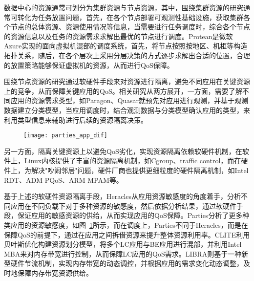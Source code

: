 
数据中心的资源通常可划分为集群资源与节点资源，其中，围绕集群资源的研究通常可转化为任务放置问题，首先，在各个节点部署可观测性基础设施，获取集群各个节点的总体资源、资源使用情况等信息，当需要进行任务调度时，综合各个节点的资源信息以及任务的资源需求求解出最优的节点进行调度。Protean\citep{hadary2020protean}是微软Azure实现的面向虚拟机混部的调度系统，首先，将节点按照按地区、机柜等构造拓扑关系，随后，在各个层次上采用分层决策的方式逐步求解出合适的位置，合理的放置策略能够保证虚拟机的资源，从而进行QoS保障。

围绕节点资源的研究通过软硬件手段来对资源进行隔离，避免不同应用在关键资源上的竞争，从而保障关键应用的QoS。相关研究从两方展开，一方面，需要了解不同应用的资源需求类型，如Paragon\citep{delimitrou2013paragon}、Quasar\citep{delimitrou2014quasar}就预先对应用进行观测，并基于观测数据建立分类模型，当应用调度时，结合观测数据与分类模型确认应用的类型，来利用类型信息来辅助进行后续的资源隔离决策。

\begin{figure}[!htbp]
    \centering
    \texttt{[image: parties\_app\_dif]}
    \label{fig:parties_app_dif}
\end{figure}

另一方面，隔离关键资源上以避免QoS劣化，实现资源隔离依赖软硬件机制，在软件上，Linux内核提供了丰富的资源隔离机制，如Cgroup、traffic control，而在硬件上，为解决"吵闹邻居"问题\citep{xu2018dcat, maricq2018taming, rzadca2020autopilot, kwon2020dc}，硬件厂商也提供更细粒度的硬件隔离机制，如Intel RDT、ADM PQoS\citep{amdpqos}、ARM MPAM\citep{armmpam}等。

基于上述的软硬件资源隔离手段，Heracles\citep{lo2015heracles}从应用资源敏感度的角度着手，分析不同应用在不同负载下对于多种资源的敏感度，然后依据分析结果，通过软硬件手段，保证应用的敏感资源的供给，从而实现应用的QoS保障。Parties\citep{chen2019parties}分析了更多种类应用的资源敏感度，如图~\ref{fig:parties_app_dif}所示，而在调度上，Parties不同于Heracles，而是在保障QoS的前提下，通过在应用之间拆借资源来提升整体资源利用率。CLITE\citep{patel2020clite}利用贝叶斯优化构建资源划分模型，将多个LC应用与BE应用进行混部，并利用Intel MBA来对内存带宽进行控制，从而保障LC应用的QoS需求。LIBRA\citep{zhang2021libra}则基于一种新型硬件节流机制，实现内存带宽的动态调控，并根据应用的需求变化动态调整，及时地保障内存带宽资源供给。


